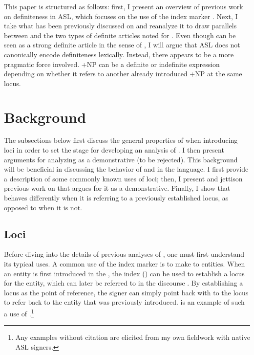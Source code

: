 \documentclass[output=paper,
modfonts
]{langscibook}
\begin{document}
This paper is structured as follows: first, I present an overview of previous work on definiteness in ASL, which focuses on the use of the index marker . Next, I take what has been previously discussed on  and reanalyze it to draw parallels between  and the two types of definite articles noted for  \citep{Jenks2015}. Even though  can be seen as a strong definite article in the sense of \citet{Schwarz2009}, I will argue that ASL does not canonically encode definiteness lexically. Instead, there appears to be a more pragmatic force involved. +NP can be a definite or indefinite expression depending on whether it refers to another already introduced +NP at the same locus.  

\section{Background}\label{sec:irani:2}

The subsections below first discuss the general properties of  when introducing loci in order to set the stage for developing an analysis of . I then present arguments for analyzing  as a demonstrative (to be rejected). This background will be beneficial in discussing the behavior of  and  in the language. I first provide a description of some commonly known uses of loci; then, I present and jettison previous work on  that argues for it as a demonstrative. Finally, I show that  behaves differently when it is referring to a previously established locus, as opposed to when it is not.

\subsection{Loci}

Before diving into the details of previous analyses of , one must first understand its typical uses. A common use of the index marker is to make  to entities. When an entity is first introduced in the , the index () can be used to establish a locus for the entity, which can later be referred to in the discourse \citep{KlimaBellugi1979,LilloMartinKlima1990}. By establishing a locus as the point of reference, the signer can simply point back with  to the locus to refer back to the entity that was previously introduced.  is an example of such a use of .\footnote{Any examples without citation are elicited from my own fieldwork with native ASL signers.}
\end{document}
